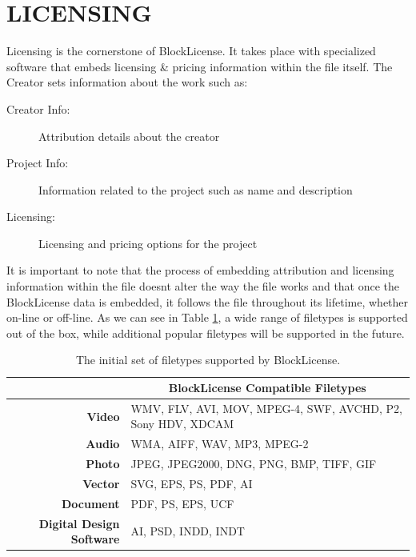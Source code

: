 
\clearpage
\section{LICENSING} \label{licensing}

Licensing is the cornerstone of BlockLicense. It takes place with specialized software that embeds licensing \& pricing information within the file itself.  The Creator sets information about the work such as:

\begin{description}
\item[Creator Info:] Attribution details about the creator 
\item[Project Info:] Information related to the project such as name and description
\item[Licensing:] Licensing and pricing options for the project
\end{description}

It is important to note that the process of embedding attribution and licensing information within the file doesn\textquotesingle t alter the way the file works and that  once the BlockLicense data is embedded, it follows the file throughout its lifetime, whether on-line or off-line. As we can see in Table \ref{table:filetypes}, a wide range of filetypes is supported out of the box, while additional popular filetypes will be supported in the future. 

\begin{table}[t]
\centering
\begin{tabular}{@{}rl@{}}
\toprule
\multicolumn{1}{l}{}             & \multicolumn{1}{c}{\textbf{BlockLicense Compatible Filetypes}}         \\ \midrule
\textbf{Video}                   & WMV, FLV, AVI, MOV, MPEG-4, SWF, AVCHD, P2, Sony HDV, XDCAM \\
\textbf{Audio}                   & WMA, AIFF, WAV, MP3, MPEG-2                                 \\
\textbf{Photo}                   & JPEG, JPEG2000, DNG, PNG, BMP, TIFF, GIF                    \\
\textbf{Vector}                  & SVG, EPS, PS, PDF, AI                                       \\
\textbf{Document}                & PDF, PS, EPS, UCF                                           \\
\textbf{Digital Design Software} & AI,  PSD, INDD, INDT                                        \\ \bottomrule
\end{tabular}
\caption{The initial set of filetypes supported by BlockLicense.}
\label{table:filetypes}
\end{table}

